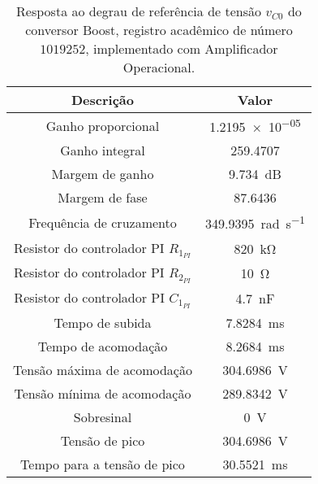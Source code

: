 \begin{table}[!ht]
\centering
\caption{Resposta ao degrau de referência de tensão $v_{C0}$ do conversor Boost, registro acadêmico de número $1019252$, implementado com Amplificador Operacional.}
\label{tab:resposta1malhaAmpOp}
\begin{tabular}{@{}cc@{}}
\toprule
\textbf{Descrição} & \textbf{Valor}\\ \midrule
Ganho proporcional & \SI{1.2195e-05}{}\\
Ganho integral & \SI{259.4707}{}\\
Margem de ganho & \SI{9.734}{\deci\bel}\\
Margem de fase & \SI{87.6436}{}\\
Frequência de cruzamento & \SI{349.9395}{\radian\per\s}\\
Resistor do controlador PI $R_{1_{PI}}$ & \SI{820}{\kilo\ohm}\\
Resistor do controlador PI $R_{2_{PI}}$ & \SI{10}{\ohm}\\
Resistor do controlador PI $C_{1_{PI}}$ & \SI{4.7}{\nano\F}\\
Tempo de subida & \SI{7.8284}{\milli\s}\\
Tempo de acomodação & \SI{8.2684}{\milli\s}\\
Tensão máxima de acomodação & \SI{304.6986}{\V}\\
Tensão mínima de acomodação & \SI{289.8342}{\V}\\
Sobresinal & \SI{0}{\V}\\
Tensão de pico & \SI{304.6986}{\V}\\
Tempo para a tensão de pico & \SI{30.5521}{\milli\s}\\
\bottomrule
\end{tabular}
\end{table}

